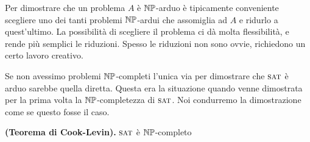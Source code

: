 Per dimostrare che un problema $A$ è $\mathbb{NP}$-arduo è tipicamente conveniente scegliere uno dei
tanti problemi $\mathbb{NP}$-ardui che assomiglia ad $A$ e ridurlo a quest'ultimo. La possibilità di
scegliere il problema ci dà molta flessibilità, e rende più semplici le riduzioni. Spesso le
riduzioni non sono ovvie, richiedono un certo lavoro creativo.

Se non avessimo problemi $\mathbb{NP}$-completi l'unica via per dimostrare che $\textsc{sat}$ è arduo sarebbe
quella diretta. Questa era la situazione quando venne dimostrata per la prima volta la
$\mathbb{NP}$-completezza di $\textsc{sat}$. Noi condurremo la dimostrazione come se questo fosse il caso.

\begin{thm}
    \textbf{(Teorema di Cook-Levin).} $\textsc{sat}$ è $\mathbb{NP}$-completo
\end{thm}
